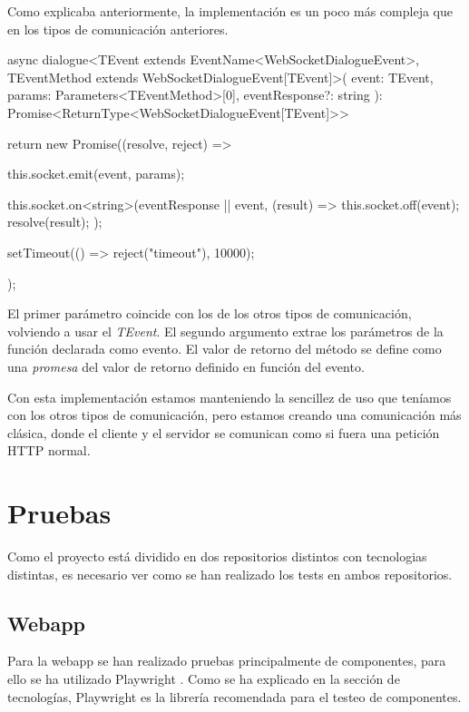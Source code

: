 Como explicaba anteriormente, la implementación es un poco más compleja que en los tipos de comunicación anteriores. 

\begin{mytypescript}[float={!h},caption={Implementación del método \textit{dialogue}.},label={alg:etiqueta}]
	async dialogue<TEvent extends EventName<WebSocketDialogueEvent>, TEventMethod extends WebSocketDialogueEvent[TEvent]>(
	event: TEvent,
	params: Parameters<TEventMethod>[0],
	eventResponse?: string
	): Promise<ReturnType<WebSocketDialogueEvent[TEvent]>> {
		return new Promise((resolve, reject) => {
			this.socket.emit(event, params);

			this.socket.on<string>(eventResponse || event, (result) => {
				this.socket.off(event);
				resolve(result);
			});

			setTimeout(() => reject("timeout"), 10000);
		});
	}
\end{mytypescript}

El primer parámetro coincide con los de los otros tipos de comunicación, volviendo a usar el \textit{TEvent}. El segundo argumento extrae los parámetros de la función declarada como evento. El valor de retorno del método se define como una \textit{promesa} del valor de retorno definido en función del evento.

Con esta implementación estamos manteniendo la sencillez de uso que teníamos con los otros tipos de comunicación, pero estamos creando una comunicación más clásica, donde el cliente y el servidor se comunican como si fuera una petición HTTP normal.


\section{Pruebas}

Como el proyecto está dividido en dos repositorios distintos con tecnologias distintas, es necesario ver como se han realizado los tests en ambos repositorios.

\subsection{Webapp}
Para la webapp se han realizado pruebas principalmente de componentes, para ello se ha utilizado Playwright . Como se ha explicado en la sección de tecnologías, Playwright es la librería recomendada para el testeo de componentes.


